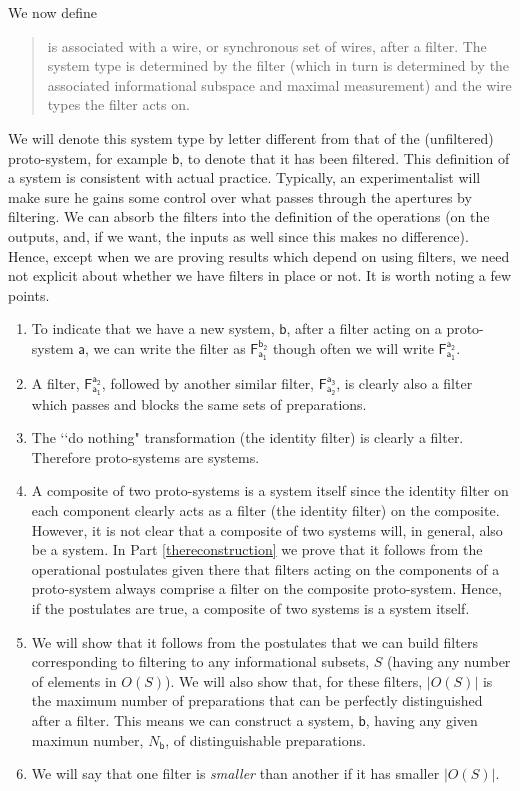 \documentclass[10pt]{article}
\begin{document}
We now define
\begin{quote}
 is associated with a wire, or synchronous set of wires, after a filter.
The system type is determined by the filter (which in turn is determined by the associated informational subspace and maximal measurement) and the wire types the filter acts on.
\end{quote}
We will denote this system type by letter different from that of the (unfiltered) proto-system, for example $\mathsf b$, to denote that it has been filtered.
This definition of a system is consistent with actual practice. Typically, an experimentalist will make sure he gains some control over what passes through the apertures by filtering.   We can absorb the filters into the definition of the operations (on the outputs, and, if we want, the inputs as well since this makes no difference).  Hence, except when we are proving results which depend on using filters, we need not explicit about whether we have filters in place or not. It is worth noting a few points.
\begin{enumerate}
\item To indicate that we have a new system, $\mathsf b$, after a filter acting on a proto-system $\mathsf a$, we can write the filter as $\mathsf{ F_{a_1}^{b_2}}$ though often we will write $\mathsf{ F_{a_1}^{a_2}}$.
\item A filter, $\mathsf{ F_{a_1}^{a_2}}$, followed by another similar filter, $\mathsf{ F_{a_2}^{a_3}}$, is clearly also a filter which passes and blocks the same sets of preparations.
\item The \lq\lq do nothing" transformation (the identity filter) is clearly a filter.  Therefore proto-systems are systems.
\item A composite of two proto-systems is a system itself since the identity filter on each component clearly acts as a filter (the identity filter) on the composite.  However, it is not clear that a composite of two systems will, in general, also be a system. In Part \ref{thereconstruction} we prove that it follows from the operational postulates given there that filters acting on the components of a proto-system always comprise a filter on the composite proto-system. Hence, if the postulates are true, a composite of two systems is a system itself.
\item We will show that it follows from the postulates that we can build filters corresponding to filtering to any informational subsets, $S$ (having any number of elements in $O(S)$).  We will also show that, for these filters, $|O(S)|$ is the maximum number of preparations that can be perfectly distinguished after a filter.    This means we can construct a system, $\mathsf b$, having any given maximun number, $N_\mathsf{b}$, of distinguishable preparations.
\item We will say that one filter is \emph{smaller} than another if it has smaller $|O(S)|$.
\end{enumerate}
\end{document}

